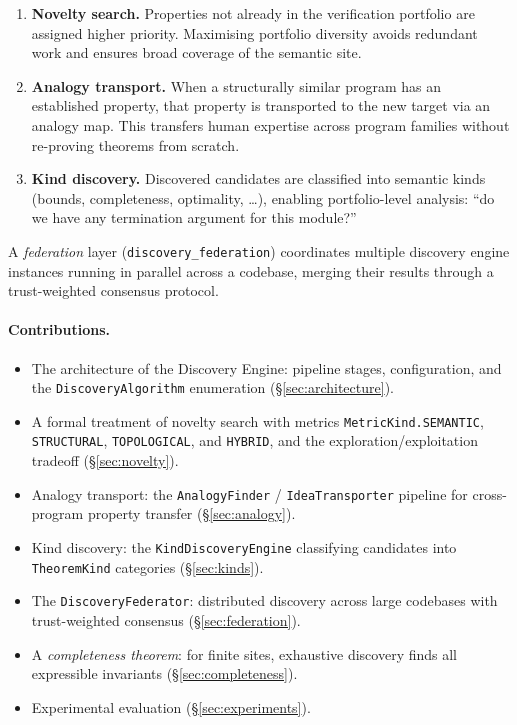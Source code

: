 \documentclass[11pt]{article}
\newcommand{\alg}[1]{\texttt{\small #1}}   %
\begin{document}
\begin{enumerate}[leftmargin=*,label=(\roman*)]
  \item \textbf{Novelty search.} Properties not already in the verification
    portfolio are assigned higher priority.  Maximising portfolio diversity
    avoids redundant work and ensures broad coverage of the semantic site.

  \item \textbf{Analogy transport.} When a structurally similar program
    has an established property, that property is transported to the
    new target via an analogy map.  This transfers human expertise
    across program families without re-proving theorems from scratch.

  \item \textbf{Kind discovery.} Discovered candidates are classified
    into semantic kinds (bounds, completeness, optimality, \ldots),
    enabling portfolio-level analysis: \eg{} ``do we have any
    termination argument for this module?''
\end{enumerate}

A \emph{federation} layer (\texttt{discovery\_federation}) coordinates
multiple discovery engine instances running in parallel across a
codebase, merging their results through a trust-weighted consensus
protocol.

\paragraph{Contributions.}
\begin{itemize}[leftmargin=*]
  \item The architecture of the \JuGeo{} Discovery Engine: pipeline
    stages, configuration, and the \alg{DiscoveryAlgorithm} enumeration
    (\S\ref{sec:architecture}).
  \item A formal treatment of novelty search with metrics
    \alg{MetricKind.SEMANTIC}, \alg{STRUCTURAL}, \alg{TOPOLOGICAL},
    and \alg{HYBRID}, and the exploration/exploitation tradeoff
    (\S\ref{sec:novelty}).
  \item Analogy transport: the \alg{AnalogyFinder} / \alg{IdeaTransporter}
    pipeline for cross-program property transfer (\S\ref{sec:analogy}).
  \item Kind discovery: the \alg{KindDiscoveryEngine} classifying
    candidates into \alg{TheoremKind} categories (\S\ref{sec:kinds}).
  \item The \alg{DiscoveryFederator}: distributed discovery across
    large codebases with trust-weighted consensus (\S\ref{sec:federation}).
  \item A \emph{completeness theorem}: for finite sites, exhaustive
    discovery finds all expressible invariants (\S\ref{sec:completeness}).
  \item Experimental evaluation (\S\ref{sec:experiments}).
\end{itemize}
\end{document}
